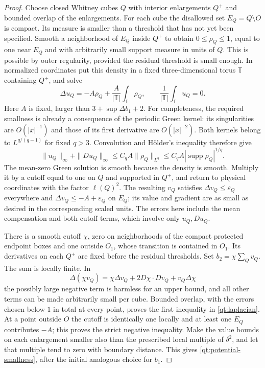 \documentclass[11pt]{article}
\numberwithin{equation}{section}
\theoremstyle{definition}
\theoremstyle{remark}
\DeclareMathOperator{\supp}{supp}
\begin{document}
\begin{proof}
Choose closed Whitney cubes $Q$ with interior enlargements $Q^+$ and
bounded overlap of the enlargements.  For each cube the disallowed set
$E_Q=Q\setminus O$ is compact.  Its measure is smaller than a threshold
that has not yet been specified.  Smooth a neighborhood of $E_Q$ inside
$Q^+$ to obtain $0\leq\rho_Q\leq1$, equal to one near $E_Q$ and with
arbitrarily small support measure in units of $Q$.  This is possible by
outer regularity, provided the residual threshold is small enough.
In normalized coordinates put this density in a fixed three-dimensional
torus $\mathbb T$ containing $Q^+$, and solve
\[
 \Delta u_Q=-A\rho_Q+
       \frac{A}{|\mathbb T|}\int_{\mathbb T}\rho_Q,\qquad
 \frac{1}{|\mathbb T|}\int_{\mathbb T}u_Q=0.
\]
Here $A$ is fixed, larger than $3+\sup\Delta b_1+2$.
For completeness, the required smallness is already a consequence of
the periodic Green kernel: its singularities are $O(|x|^{-1})$ and those
of its first derivative are $O(|x|^{-2})$.  Both kernels belong to
$L^{q/(q-1)}$ for fixed $q>3$.  Convolution and H\"older's inequality
therefore give
\[
 \|u_Q\|_\infty+\|Du_Q\|_\infty
 \leq C_q A\|\rho_Q\|_{L^q}
 \leq C_q A|\supp\rho_Q|^{1/q}.
\]
The mean-zero Green solution is smooth because the density is smooth.
Multiply it by a cutoff equal to one on $Q$ and supported in $Q^+$,
and return to physical coordinates with the factor $\ell(Q)^2$.
The resulting $v_Q$ satisfies $\Delta v_Q\leq\varepsilon_Q$
everywhere and $\Delta v_Q\leq-A+\varepsilon_Q$ on $E_Q$;
its value and gradient are as small as desired in the corresponding
scaled units.  The errors here include the mean compensation and both
cutoff terms, which involve only $u_Q,Du_Q$.

There is a smooth cutoff $\chi$, zero on neighborhoods of the compact
protected endpoint boxes and one outside $O_1$, whose transition is
contained in $O_1$.  Its derivatives on each $Q^+$ are fixed before the
residual thresholds.  Set $b_2=\chi\sum_Qv_Q$.  The sum is locally
finite.  In
\[
 \Delta(\chi v_Q)=\chi\Delta v_Q+2D\chi\cdot Dv_Q+v_Q\Delta\chi
\]
the possibly large negative term is harmless for an upper bound, and
all other terms can be made arbitrarily small per cube.  Bounded overlap,
with the errors chosen below $1$ in total at every point, proves the
first inequality in \eqref{qt:laplacian}.  At a point outside $O$ the
cutoff is identically one locally and at least one $E_Q$ contributes
$-A$; this proves the strict negative inequality.  Make the value bounds
on each enlargement smaller also than the prescribed local multiple of
$\delta^2$, and let that multiple tend to zero with boundary distance.
This gives \eqref{qt:potential-smallness}, after the initial analogous
choice for $b_1$.


\end{proof}
\end{document}
